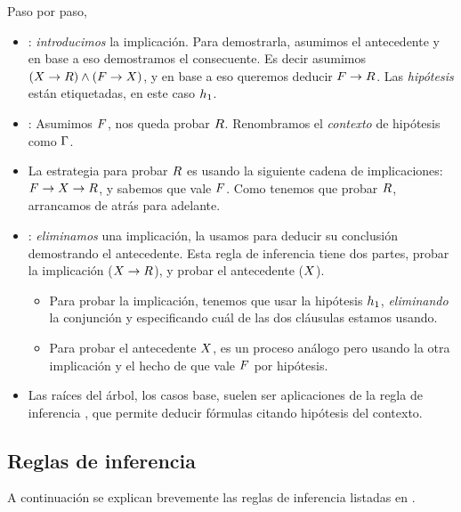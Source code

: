 \begin{ejemplo}
    Paso por paso,

    \begin{itemize}
        \item {}: \textit{introducimos} la implicación. Para demostrarla,
        asumimos el antecedente y en base a eso demostramos el consecuente. Es
        decir asumimos $(X \to R) \wedge (F \to
        X)$, y en base a eso queremos deducir $F \to R$.
        Las \textit{hipótesis} están etiquetadas, en este caso $h_1$.
        \item {}: Asumimos $F$, nos queda probar $R$.
        Renombramos el \textit{contexto} de hipótesis como $\Gamma$.
        \item La estrategia para probar $R$ es usando la siguiente cadena
        de implicaciones: $F \to X \to R$, y sabemos que
        vale $F$. Como tenemos que probar $R$, arrancamos de atrás para
        adelante.
        \item {}: \textit{eliminamos} una implicación, la usamos para
        deducir su conclusión demostrando el antecedente. Esta regla de
        inferencia tiene dos partes, probar la implicación ($X \to
        R$), y probar el antecedente ($X$).
        \begin{itemize}
            \item Para probar la implicación, tenemos que usar la hipótesis
            $h_1$, \textit{eliminando} la conjunción y especificando cuál
            de las dos cláusulas estamos usando.
            \item Para probar el antecedente $X$, es un proceso análogo
            pero usando la otra implicación y el hecho de que vale $F$ por hipótesis.
        \end{itemize}
        \item Las raíces del árbol, los casos base, suelen ser aplicaciones de
        la regla de inferencia , que permite deducir fórmulas citando
        hipótesis del contexto.
    \end{itemize}
\end{ejemplo}

\subsection{Reglas de inferencia}

A continuación se explican brevemente las reglas de inferencia listadas en .

